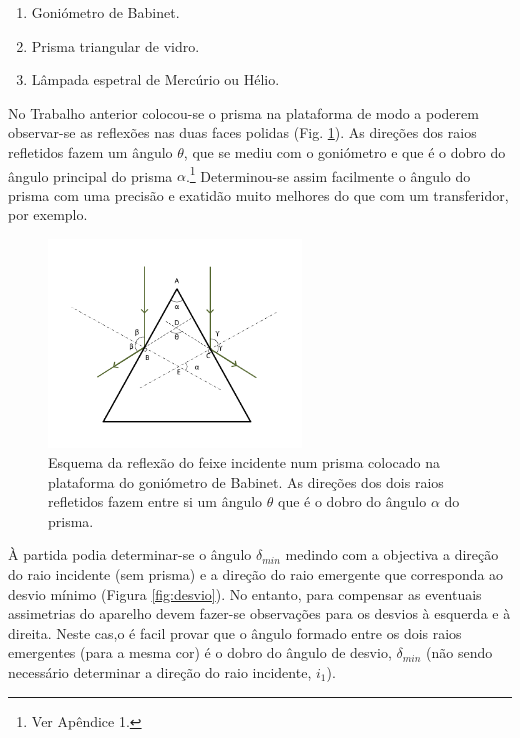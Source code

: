 \documentclass[a4paper,12pt]{article}  %
\begin{document}
\begin{enumerate}
\item Goniómetro de Babinet.
\item Prisma triangular de vidro.
\item Lâmpada espetral de Mercúrio ou Hélio.
\end{enumerate}

No Trabalho anterior colocou-se o prisma na plataforma de modo a poderem observar-se as reflexões nas duas faces polidas (Fig. \ref{fig:angulo}). As direções dos raios refletidos fazem um ângulo $\theta$, que se mediu com o goniómetro e que é o dobro do ângulo principal do prisma $\alpha$.\footnote{Ver Apêndice 1.}  Determinou-se  assim facilmente o ângulo do prisma com uma precisão e exatidão muito melhores do que com um transferidor, por exemplo.

\begin{figure}[tb]  \centering 
	\includegraphics[width=0.6\textwidth]{angulo}
	\caption{Esquema da reflexão do feixe incidente num prisma colocado na plataforma do goniómetro de Babinet. As direções dos dois raios refletidos fazem entre si um ângulo $\theta$ que é o dobro do ângulo $\alpha$ do prisma. \label{fig:angulo}} 
\end{figure}

À partida podia determinar-se  o ângulo $\delta_{min}$ medindo com a objectiva a direção do raio incidente (sem prisma) e a direção do raio emergente que corresponda ao desvio mínimo (Figura \ref{fig:desvio}). No entanto, para compensar as eventuais assimetrias do aparelho devem fazer-se observações para os desvios à esquerda e à direita.
Neste cas,o é facil provar que o ângulo formado entre os dois raios emergentes (para a mesma cor) é o dobro do ângulo de desvio, $\delta_{min}$ (não sendo  necessário determinar a direção do raio incidente, $i_1$).
\end{document}
